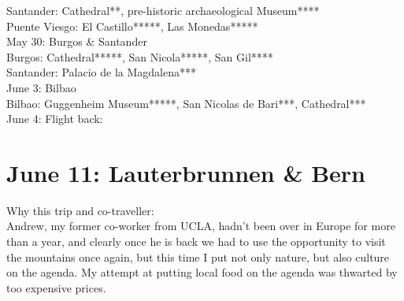 Santander: Cathedral**, pre-historic archaeological Museum****\\
Puente Viesgo: El Castillo*****, Las Monedas*****\\

May 30: Burgos \& Santander\\
Burgos: Cathedral*****, San Nicola*****, San Gil****\\
Santander: Palacio de la Magdalena***\\

June 3: Bilbao\\
Bilbao: Guggenheim Museum*****, San Nicolas de Bari***, Cathedral***\\

June 4: Flight back:\\

\section{June 11: Lauterbrunnen \& Bern}
\label{LauterbrunnenBern2016}

Why this trip and co-traveller:\\
Andrew, my former co-worker from UCLA, hadn't been over in Europe for more than a year, and clearly once he is back we had to use the opportunity to visit the mountains once again, but this time I put not only nature, but also culture on the agenda. My attempt at putting local food on the agenda was thwarted by too expensive prices.\\

